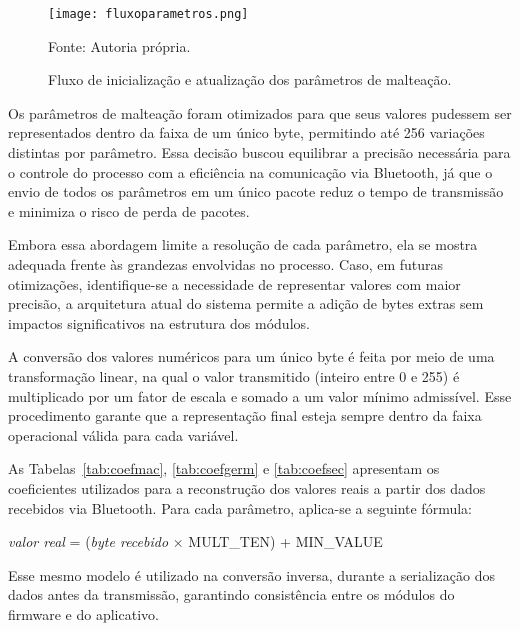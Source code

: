 \begin{figure}[H]
    \centering
    \caption{Fluxo de inicialização e atualização dos parâmetros de malteação.}
    \label{fig:fluxoparametros}
    \texttt{[image: fluxoparametros.png]}

    {\centering\footnotesize Fonte: Autoria própria.\par}
\end{figure}

Os parâmetros de malteação foram otimizados para que seus valores pudessem ser representados dentro da faixa de um único byte, permitindo até 256 variações distintas por parâmetro. Essa decisão buscou equilibrar a precisão necessária para o controle do processo com a eficiência na comunicação via Bluetooth, já que o envio de todos os parâmetros em um único pacote reduz o tempo de transmissão e minimiza o risco de perda de pacotes.

Embora essa abordagem limite a resolução de cada parâmetro, ela se mostra adequada frente às grandezas envolvidas no processo. Caso, em futuras otimizações, identifique-se a necessidade de representar valores com maior precisão, a arquitetura atual do sistema permite a adição de bytes extras sem impactos significativos na estrutura dos módulos.

A conversão dos valores numéricos para um único byte é feita por meio de uma transformação linear, na qual o valor transmitido (inteiro entre 0 e 255) é multiplicado por um fator de escala e somado a um valor mínimo admissível. Esse procedimento garante que a representação final esteja sempre dentro da faixa operacional válida para cada variável.

As Tabelas~\ref{tab:coefmac}, \ref{tab:coefgerm} e \ref{tab:coefsec} apresentam os coeficientes utilizados para a reconstrução dos valores reais a partir dos dados recebidos via Bluetooth. Para cada parâmetro, aplica-se a seguinte fórmula:

\begin{center}
    \textit{valor real} = (\textit{byte recebido} × MULT\_TEN) + MIN\_VALUE
\end{center}

Esse mesmo modelo é utilizado na conversão inversa, durante a serialização dos dados antes da transmissão, garantindo consistência entre os módulos do firmware e do aplicativo.

